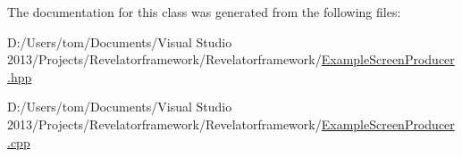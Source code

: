 The documentation for this class was generated from the following files\-:\begin{DoxyCompactItemize}
\item 
D\-:/\-Users/tom/\-Documents/\-Visual Studio 2013/\-Projects/\-Revelatorframework/\-Revelatorframework/\hyperlink{_example_screen_producer_8hpp}{Example\-Screen\-Producer.\-hpp}\item 
D\-:/\-Users/tom/\-Documents/\-Visual Studio 2013/\-Projects/\-Revelatorframework/\-Revelatorframework/\hyperlink{_example_screen_producer_8cpp}{Example\-Screen\-Producer.\-cpp}\end{DoxyCompactItemize}
